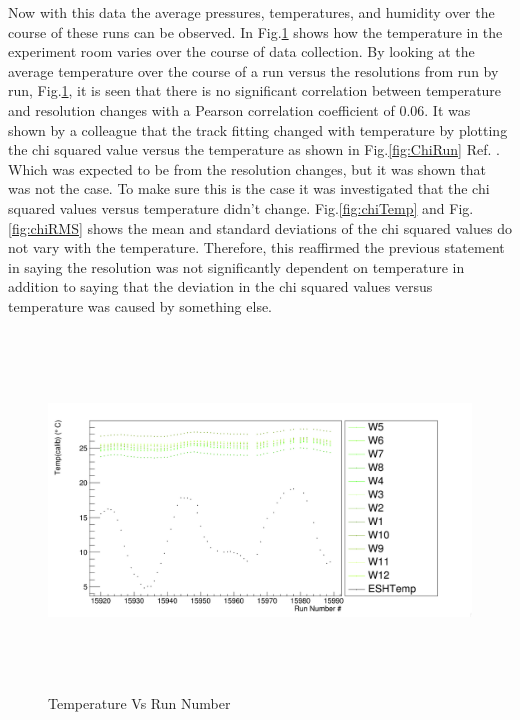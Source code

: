 \documentclass[./Thesis]{subfiles}
\begin{document}
	
	 Now with this data the average pressures, temperatures, and humidity over the course of these runs can be observed.  In Fig.\ref{fig:TempRun} shows how the temperature in the experiment room varies over the course of data collection. By looking at the average temperature over the course of a run versus the resolutions from run by run, Fig.\ref{fig:TempRun}, it is seen that there is no significant correlation between temperature and resolution changes with a Pearson correlation coefficient of 0.06. It was shown by a colleague that the track fitting changed with temperature by plotting the chi squared value versus the temperature as shown in Fig.\ref{fig:ChiRun} Ref.\cite{mLanc} . Which was expected to be from the resolution changes, but it was shown that was not the case.  To make sure this is the case it was investigated that the chi squared values versus temperature didn't change.  Fig.\ref{fig:chiTemp} and Fig.\ref{fig:chiRMS} shows the mean and standard deviations of the chi squared values do not vary with the temperature. Therefore, this reaffirmed the previous statement in saying the resolution was not significantly dependent on temperature in addition to saying that the deviation in the chi squared values versus temperature was caused by something else.
	
\begin{figure}
	\centerline{\includegraphics[height=95mm]{TempVsRunNumber.png}}
	\caption[Temperature Vs Run Number]{ Temperature Vs Run Number}
	\label{fig:TempRun}
\end{figure} 
\end{document}
